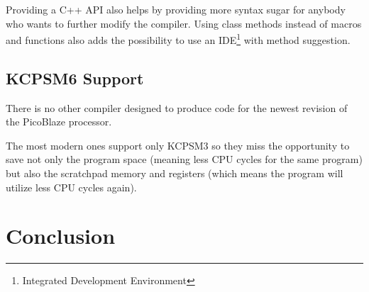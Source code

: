     Providing a C++ API also helps by providing more syntax sugar for anybody who wants to further modify the compiler. Using class methods instead of macros and functions also adds the possibility to use an IDE\footnote{Integrated Development Environment} with method suggestion.

    \section{KCPSM6 Support}

    There is no other compiler designed to produce code for the newest revision of the PicoBlaze processor.

    The most modern ones support only KCPSM3 so they miss the opportunity to save not only the program space (meaning less CPU cycles for the same program) but also the scratchpad memory and registers (which means the program will utilize less CPU cycles again).

\chapter{Conclusion}\label{conclusion}


\cite{TBD}
